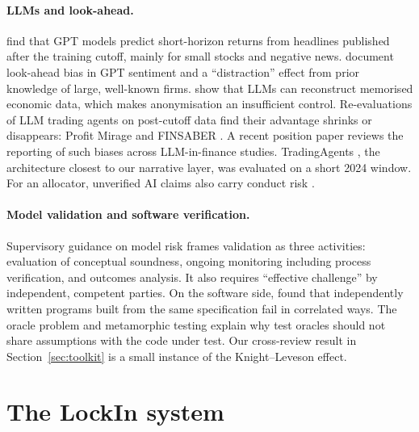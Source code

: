 \documentclass[11pt]{article}
\begin{document}
\paragraph{LLMs and look-ahead.} \citet{LopezLiraTang2023} find that GPT models predict short-horizon returns from headlines published after the training cutoff, mainly for small stocks and negative news. \citet{GlassermanLin2023} document look-ahead bias in GPT sentiment and a ``distraction'' effect from prior knowledge of large, well-known firms. \citet{LopezLiraTangZhu2025} show that LLMs can reconstruct memorised economic data, which makes anonymisation an insufficient control. Re-evaluations of LLM trading agents on post-cutoff data find their advantage shrinks or disappears: Profit Mirage \citep{LiEtAl2025ProfitMirage} and FINSABER \citep{LiEtAl2025FINSABER}. A recent position paper \citep{KongEtAl2026Bias} reviews the reporting of such biases across LLM-in-finance studies. TradingAgents \citep{XiaoEtAl2024TradingAgents}, the architecture closest to our narrative layer, was evaluated on a short 2024 window. For an allocator, unverified AI claims also carry conduct risk \citep{SEC2024AIwashing}.

\paragraph{Model validation and software verification.} Supervisory guidance on model risk \citep{SR117} frames validation as three activities: evaluation of conceptual soundness, ongoing monitoring including process verification, and outcomes analysis. It also requires ``effective challenge'' by independent, competent parties. On the software side, \citet{KnightLeveson1986} found that independently written programs built from the same specification fail in correlated ways. The oracle problem \citep{BarrEtAl2015Oracle} and metamorphic testing \citep{SeguraEtAl2016Metamorphic} explain why test oracles should not share assumptions with the code under test. Our cross-review result in Section~\ref{sec:toolkit} is a small instance of the Knight--Leveson effect.

\section{The LockIn system}\label{sec:system}
\end{document}
